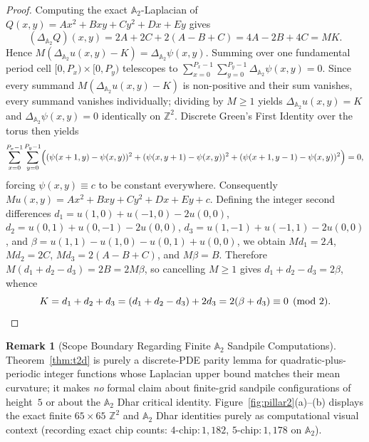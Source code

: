 \documentclass[11pt,reqno]{amsart}
\theoremstyle{plain}
\theoremstyle{definition}
\newtheorem{remark}[theorem]{Remark}
\newcommand{\ZZ}{\mathbb{Z}}
\begin{document}
\begin{proof}
Computing the exact $\mathbb{A}_2$-Laplacian of $Q(x,y) = A x^2 + B x y + C y^2 + D x + E y$ gives
\begin{equation}
  (\Delta_{\mathbb{A}_2} Q)(x,y) = 2A + 2C + 2(A - B + C) = 4A - 2B + 4C = M K.
\end{equation}
Hence $M(\Delta_{\mathbb{A}_2} u(x,y) - K) = \Delta_{\mathbb{A}_2} \psi(x,y)$. Summing over one fundamental period cell $[0, P_x) \times [0, P_y)$ telescopes to $\sum_{x=0}^{P_x-1}\sum_{y=0}^{P_y-1} \Delta_{\mathbb{A}_2} \psi(x,y) = 0$. Since every summand $M(\Delta_{\mathbb{A}_2} u(x,y) - K)$ is non-positive and their sum vanishes, every summand vanishes individually; dividing by $M \ge 1$ yields $\Delta_{\mathbb{A}_2} u(x,y) = K$ and $\Delta_{\mathbb{A}_2} \psi(x,y) = 0$ identically on $\ZZ^2$. Discrete Green's First Identity over the torus then yields
\begin{equation}
  \sum_{x=0}^{P_x-1}\sum_{y=0}^{P_y-1} \Bigl( (\psi(x+1,y)-\psi(x,y))^2 + (\psi(x,y+1)-\psi(x,y))^2 + (\psi(x+1,y-1)-\psi(x,y))^2 \Bigr) = 0,
\end{equation}
forcing $\psi(x,y) \equiv c$ to be constant everywhere. Consequently $M u(x,y) = A x^2 + B x y + C y^2 + D x + E y + c$. Defining the integer second differences $d_1 = u(1,0) + u(-1,0) - 2u(0,0)$, $d_2 = u(0,1) + u(0,-1) - 2u(0,0)$, $d_3 = u(1,-1) + u(-1,1) - 2u(0,0)$, and $\beta = u(1,1) - u(1,0) - u(0,1) + u(0,0)$, we obtain $M d_1 = 2A$, $M d_2 = 2C$, $M d_3 = 2(A - B + C)$, and $M \beta = B$. Therefore $M(d_1 + d_2 - d_3) = 2B = 2M\beta$, so cancelling $M \ge 1$ gives $d_1 + d_2 - d_3 = 2\beta$, whence
\begin{equation}
  K = d_1 + d_2 + d_3 = (d_1 + d_2 - d_3) + 2 d_3 = 2(\beta + d_3) \equiv 0 \pmod{2}. \qedhere
\end{equation}
\end{proof}

\begin{remark}[Scope Boundary Regarding Finite $\mathbb{A}_2$ Sandpile Computations]
Theorem~\ref{thm:t2d} is purely a discrete-PDE parity lemma for quadratic-plus-periodic integer functions whose Laplacian upper bound matches their mean curvature; it makes \emph{no} formal claim about finite-grid sandpile configurations of height~$5$ or about the $\mathbb{A}_2$ Dhar critical identity. Figure~\ref{fig:pillar2}(a)--(b) displays the exact finite $65\times 65$ $\ZZ^2$ and $\mathbb{A}_2$ Dhar identities purely as computational visual context (recording exact chip counts: $4\text{-chip}: 1{,}182$, $5\text{-chip}: 1{,}178$ on $\mathbb{A}_2$).
\end{remark}
\end{document}
